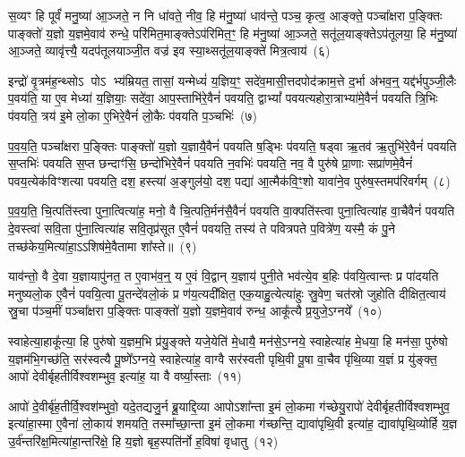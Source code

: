 स॒व्यꣳ हि पूर्वं॑ मनु॒ष्या॑ आ॒ञ्जते॒ न नि धा॑वते॒ नीव॒ हि म॑नु॒ष्या॑ धाव॑न्ते॒ पञ्च॒ कृत्व॒ आङ्क्ते॒ पञ्चा᳚क्षरा प॒ङ्क्तिः पाङ्क्तो॑ य॒ज्ञो य॒ज्ञमे॒वाव॑ रुन्धे॒ परि॑मित॒माङ्क्ते\-ऽप॑रिमित॒ꣳ॒ हि म॑नु॒ष्या॑ आ॒ञ्जते॒ सतू॑ल॒याङ्क्ते\-ऽप॑तूलया॒ हि म॑नु॒ष्या॑ आ॒ञ्जते॒ व्यावृ॑त्त्यै॒ यदप॑तूलयाञ्जी॒त वज्र॑ इव स्या॒थ्सतू॑ल॒याङ्क्ते॑ मित्र॒त्वाय॑~(६)

इन्द्रो॑ वृ॒त्रम॑ह॒न्थ्सो\-ऽ पो\-ऽ भ्य॑म्रियत॒ तासां॒ यन्मेध्यं॑ य॒ज्ञिय॒ꣳ॒ सदे॑व॒मासी॒त्तदपोद॑क्राम॒त्ते द॒र्भा अ॑भव॒न्॒ यद्द॑र्भपुञ्जी॒लैः प॒वय॑ति॒ या ए॒व मेध्या॑ य॒ज्ञियाः॒ सदे॑वा॒ आप॒स्ताभि॑रे॒वैनं॑ पवयति॒ द्वा\-भ्यां᳚ पवयत्यहोरा॒त्राभ्या॑मे॒वैनं॑ पवयति त्रि॒भिः प॑वयति॒ त्रय॑ इ॒मे लो॒का ए॒भिरे॒वैनं॑ लो॒कैः प॑वयति प॒ञ्चभिः॑~(७)

प॒व॒य॒ति॒ पञ्चा᳚क्षरा प॒ङ्क्तिः पाङ्क्तो॑ य॒ज्ञो य॒ज्ञायै॒वैनं॑ पवयति ष॒ड्भिः प॑वयति॒ षड्वा ऋ॒तव॑ ऋ॒तुभि॑रे॒वैनं॑ पवयति स॒प्तभिः॑ पवयति स॒प्त छन्दाꣳ॑सि॒ छन्दो॑भिरे॒वैनं॑ पवयति न॒वभिः॑ पवयति॒ नव॒ वै पुरु॑षे प्रा॒णाः सप्रा॑णमे॒वैनं॑ पव\-य॒त्येक॑विꣳशत्या पवयति॒ दश॒ हस्त्या॑ अ॒ङ्गुल॑यो॒ दश॒ पद्या॑ आ॒त्मैक॑वि॒ꣳ॒शो यावा॑ने॒व पुरु॑ष॒स्तमप॑रिवर्गम्~(८)

प॒व॒य॒ति॒ चि॒त्पति॑स्त्वा पुना॒त्वित्या॑ह॒ मनो॒ वै चि॒त्पति॒र्मन॑सै॒वैनं॑ पवयति वा॒क्पति॑स्त्वा पुना॒त्वित्या॑ह वा॒चैवैनं॑ पवयति दे॒वस्त्वा॑ सवि॒ता पु॑ना॒त्वित्या॑ह सवि॒तृप्र॑सूत ए॒वैनं॑ पवयति॒ तस्य॑ ते पवित्रपते प॒वित्रे॑ण॒ यस्मै॒ कं पु॒ने तच्छ॑केय॒मित्या॑हा॒\-ऽऽ\-शिष॑मे॒वैतामा शा᳚स्ते॥~(९)

{}%

याव॑न्तो॒ वै दे॒वा य॒ज्ञायापु॑नत॒ त ए॒वाभ॑व॒न्॒ य ए॒वं वि॒द्वान् य॒ज्ञाय॑ पुनी॒ते भव॑त्ये॒व ब॒हिः प॑वयि॒त्वान्तः प्र पा॑दयति मनुष्यलो॒क ए॒वैनं॑ पवयि॒त्वा पू॒तन्दे॑वलो॒कं प्र ण॑य॒त्यदी᳚क्षित॒ एक॒याहु॒त्येत्या॑हुः स्रु॒वेण॒ चत॑स्रो जुहोति दीक्षित॒त्वाय॑ स्रु॒चा प॑ञ्च॒मीं पञ्चा᳚क्षरा प॒ङ्क्तिः पाङ्क्तो॑ य॒ज्ञो य॒ज्ञमे॒वाव॑ रुन्ध॒ आकू᳚त्यै प्र॒युजे॒\-ऽग्नये᳚~(१०)

स्वाहेत्या॒हाकू᳚त्या॒ हि पुरु॑षो य॒ज्ञम॒भि प्र॑यु॒ङ्क्ते यजे॒येति॑ मे॒धायै॒ मन॑से॒\-ऽग्नये॒ स्वाहेत्या॑ह मे॒धया॒ हि मन॑सा॒ पुरु॑षो य॒ज्ञम॑भि॒गच्छ॑ति॒ सर॑स्वत्यै पू॒ष्णे᳚\-ऽग्नये॒ स्वाहेत्या॑ह॒ वाग्वै सर॑स्वती पृथि॒वी पू॒षा वा॒चैव पृ॑थि॒व्या य॒ज्ञं प्र यु॑ङ्क्त॒ आपो॑ देवीर्बृहतीर्विश्वशम्भुव॒ इत्या॑ह॒ या वै वर्ष्या॒स्ताः~(११)

आपो॑ दे॒वीर्बृ॑ह॒तीर्वि॒श्वश॑म्भुवो॒ यदे॒तद्यजु॒र्न ब्रू॒याद्दि॒व्या आपो\-ऽशा᳚न्ता इ॒मं लो॒कमा ग॑च्छेयु॒रापो॑ देवीर्बृहतीर्विश्वशम्भुव॒ इत्या॑हा॒स्मा ए॒वैना॑ लो॒काय॑ शमयति॒ तस्मा᳚च्छा॒न्ता इ॒मं लो॒कमा ग॑च्छन्ति॒ द्यावा॑\-पृथि॒वी इत्या॑ह॒ द्यावा॑पृथि॒व्योर्\mbox{}हि य॒ज्ञ उ॒र्व॑न्तरि॑क्ष॒मित्या॑हा॒न्तरि॑क्षे॒ हि य॒ज्ञो बृह॒स्पति॑र्नो ह॒विषा॑ वृधातु~(१२)

